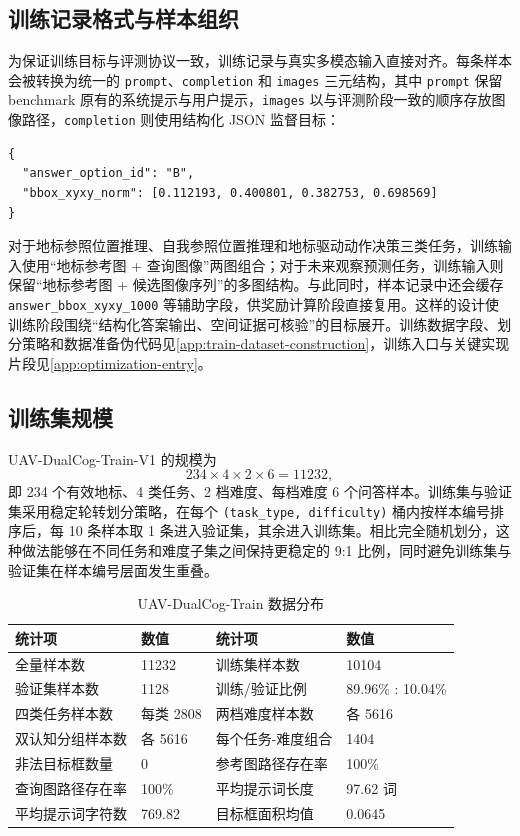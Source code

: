 \subsection{训练记录格式与样本组织}

为保证训练目标与评测协议一致，训练记录与真实多模态输入直接对齐。每条样本会被转换为统一的 \texttt{prompt}、\texttt{completion} 和 \texttt{images} 三元结构，其中 \texttt{prompt} 保留 benchmark 原有的系统提示与用户提示，\texttt{images} 以与评测阶段一致的顺序存放图像路径，\texttt{completion} 则使用结构化 JSON 监督目标：
\begin{verbatim}
{
  "answer_option_id": "B",
  "bbox_xyxy_norm": [0.112193, 0.400801, 0.382753, 0.698569]
}
\end{verbatim}
对于地标参照位置推理、自我参照位置推理和地标驱动动作决策三类任务，训练输入使用“地标参考图 + 查询图像”两图组合；对于未来观察预测任务，训练输入则保留“地标参考图 + 候选图像序列”的多图结构。与此同时，样本记录中还会缓存 \texttt{answer\_bbox\_xyxy\_1000} 等辅助字段，供奖励计算阶段直接复用。这样的设计使训练阶段围绕“结构化答案输出、空间证据可核验”的目标展开。训练数据字段、划分策略和数据准备伪代码见\autoref{app:train-dataset-construction}，训练入口与关键实现片段见\autoref{app:optimization-entry}。

\subsection{训练集规模}

UAV-DualCog-Train-V1 的规模为
\[
234 \times 4 \times 2 \times 6 = 11232,
\]
即 234 个有效地标、4 类任务、2 档难度、每档难度 6 个问答样本。训练集与验证集采用稳定轮转划分策略，在每个 \texttt{(task\_type, difficulty)} 桶内按样本编号排序后，每 10 条样本取 1 条进入验证集，其余进入训练集。相比完全随机划分，这种做法能够在不同任务和难度子集之间保持更稳定的 9:1 比例，同时避免训练集与验证集在样本编号层面发生重叠。

\begin{table}[!htbp]
    \centering
    \caption{UAV-DualCog-Train 数据分布}
    \label{tab:train-dataset-stats}
    \footnotesize
    \setlength{\tabcolsep}{4pt}
    \begin{tabularx}{\textwidth}{@{}U{4.1cm}U{2.2cm}U{4.1cm}U{2.2cm}@{}}
        \toprule
        统计项 & 数值 & 统计项 & 数值 \\
        \midrule
        全量样本数 & 11232 & 训练集样本数 & 10104 \\
        验证集样本数 & 1128 & 训练/验证比例 & 89.96\% : 10.04\% \\
        四类任务样本数 & 每类 2808 & 两档难度样本数 & 各 5616 \\
        双认知分组样本数 & 各 5616 & 每个任务-难度组合 & 1404 \\
        非法目标框数量 & 0 & 参考图路径存在率 & 100\% \\
        查询图路径存在率 & 100\% & 平均提示词长度 & 97.62 词 \\
        平均提示词字符数 & 769.82 & 目标框面积均值 & 0.0645 \\
        \bottomrule
    \end{tabularx}
\end{table}

